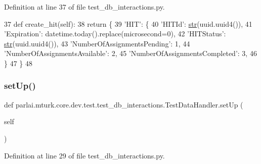 Definition at line 37 of file test\+\_\+db\+\_\+interactions.\+py.


\begin{DoxyCode}
37     \textcolor{keyword}{def }create\_hit(self):
38         \textcolor{keywordflow}{return} \{
39             \textcolor{stringliteral}{'HIT'}: \{
40                 \textcolor{stringliteral}{'HITId'}: \hyperlink{namespacegenerate__task__READMEs_a5b88452ffb87b78c8c85ececebafc09f}{str}(uuid.uuid4()),
41                 \textcolor{stringliteral}{'Expiration'}: datetime.today().replace(microsecond=0),
42                 \textcolor{stringliteral}{'HITStatus'}: \hyperlink{namespacegenerate__task__READMEs_a5b88452ffb87b78c8c85ececebafc09f}{str}(uuid.uuid4()),
43                 \textcolor{stringliteral}{'NumberOfAssignmentsPending'}: 1,
44                 \textcolor{stringliteral}{'NumberOfAssignmentsAvailable'}: 2,
45                 \textcolor{stringliteral}{'NumberOfAssignmentsCompleted'}: 3,
46             \}
47         \}
48 
\end{DoxyCode}
\mbox{\label{classparlai_1_1mturk_1_1core_1_1dev_1_1test_1_1test__db__interactions_1_1TestDataHandler_ac02ba3d2424a8f439407b11a9d920522}} 
\subsubsection{\texorpdfstring{set\+Up()}{setUp()}}
{\footnotesize\ttfamily def parlai.\+mturk.\+core.\+dev.\+test.\+test\+\_\+db\+\_\+interactions.\+Test\+Data\+Handler.\+set\+Up (\begin{DoxyParamCaption}\item[{}]{self }\end{DoxyParamCaption})}



Definition at line 29 of file test\+\_\+db\+\_\+interactions.\+py.


